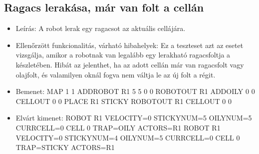 \subsection{Ragacs lerakása, már van folt a cellán
	}
\begin{itemize}
	\item Leírás: \newline
A robot lerak egy ragacsot az aktuális cellájára.
	\item Ellenőrzött funkcionalitás, várható hibahelyek: \newline
Ez a teszteset azt az esetet vizsgálja, amikor a robotnak van legalább egy lerakható ragacsfoltja a készletében. Hibát az jelenthet, ha az adott cellán már van ragacsfolt vagy olajfolt, és valamilyen oknál fogva nem váltja le az új folt a régit.

	\item Bemenet: \newline
MAP 1 1 \newline
ADDROBOT R1 5 5 0 0	 \newline
ROBOTOUT R1 \newline
ADDOILY 0 0 \newline
CELLOUT 0 0 \newline
PLACE R1 STICKY  \newline
ROBOTOUT R1 \newline
CELLOUT 0 0

	\item Elvárt kimenet: \newline
	ROBOT R1 VELOCITY=0 STICKYNUM=5 OILYNUM=5 CURRCELL=0 \newline
	CELL 0 TRAP=OILY ACTORS=R1 \newline
	ROBOT R1 VELOCITY=0 STICKYNUM=4 OILYNUM=5 CURRCELL=0 \newline
	CELL 0 TRAP=STICKY ACTORS=R1	
	
\end{itemize}

